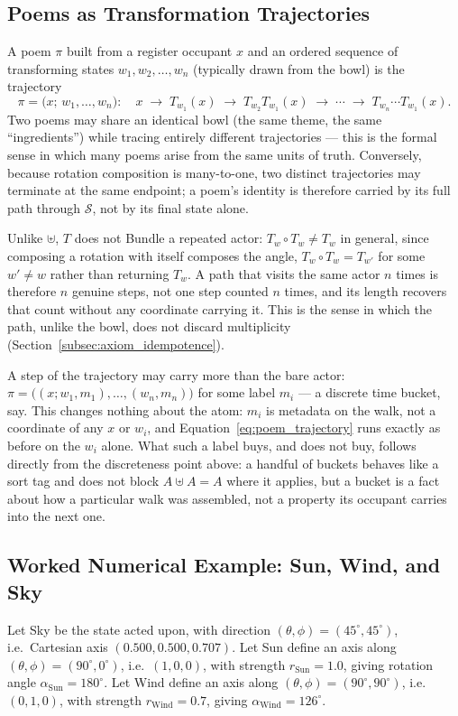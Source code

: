 \documentclass[12pt, a4paper]{article}
\begin{document}
\subsection{Poems as Transformation Trajectories}
\label{subsec:transform_trajectories}
A poem $\pi$ built from a register occupant $x$ and an ordered sequence of
transforming states $w_1, w_2, \ldots, w_n$ (typically drawn from the bowl) is the trajectory
\begin{equation}
    \pi = \big(x;\, w_1, \ldots, w_n\big): \quad
    x \;\longrightarrow\; T_{w_1}(x) \;\longrightarrow\; T_{w_2}T_{w_1}(x) \;\longrightarrow\; \cdots \;\longrightarrow\; T_{w_n}\cdots T_{w_1}(x).
    \label{eq:poem_trajectory}
\end{equation}
Two poems may share an identical bowl (the same theme, the
same ``ingredients'') while tracing entirely different trajectories
--- this is the formal sense in which many poems arise from the same
units of truth. Conversely, because rotation composition is
many-to-one, two distinct trajectories may terminate at the same
endpoint; a poem's identity is therefore carried by its full path
through $\mathcal{S}$, not by its final state alone.

Unlike $\uplus$, $T$ does not Bundle a repeated actor: $T_w\circ
T_w\neq T_w$ in general, since composing a rotation with itself
composes the angle, $T_w\circ T_w = T_{w'}$ for some $w'\neq w$ rather
than returning $T_w$. A path that visits the same actor $n$ times is
therefore $n$ genuine steps, not one step counted $n$ times, and its
length recovers that count without any coordinate carrying it. This is
the sense in which the path, unlike the bowl, does not discard
multiplicity (Section~\ref{subsec:axiom_idempotence}).

A step of the trajectory may carry more than the bare actor:
$\pi=\bigl((x;w_1,m_1),\ldots,(w_n,m_n)\bigr)$ for some label $m_i$ ---
a discrete time bucket, say. This changes nothing about the atom: $m_i$
is metadata on the walk, not a coordinate of any $x$ or $w_i$, and
Equation~\eqref{eq:poem_trajectory} runs exactly as before on the
$w_i$ alone. What such a label buys, and does not buy, follows
directly from the discreteness point above: a handful of buckets
behaves like a sort tag and does not block $A\uplus A=A$ where it
applies, but a bucket is a fact about how a particular walk was
assembled, not a property its occupant carries into the next one.

\subsection{Worked Numerical Example: Sun, Wind, and Sky}
\label{subsec:transform_example}
Let Sky be the state acted upon, with direction
$(\theta,\phi) = (45^\circ, 45^\circ)$, i.e.\ Cartesian axis
$(0.500, 0.500, 0.707)$. Let Sun define an axis along
$(\theta,\phi) = (90^\circ, 0^\circ)$, i.e.\ $(1,0,0)$, with strength
$r_{\text{Sun}} = 1.0$, giving rotation angle $\alpha_{\text{Sun}} =
180^\circ$. Let Wind define an axis along $(\theta,\phi) = (90^\circ,
90^\circ)$, i.e.\ $(0,1,0)$, with strength $r_{\text{Wind}} = 0.7$,
giving $\alpha_{\text{Wind}} = 126^\circ$.
\end{document}
